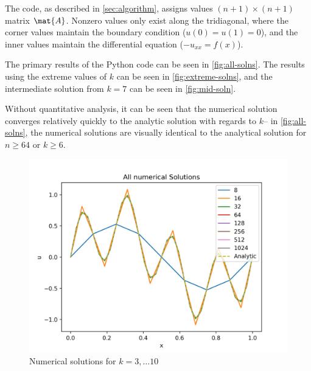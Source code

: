 \documentclass{template}
\begin{document}
The code, as described in \autoref{sec:algorithm}, assigns values $(n+1)\times(n+1)$ matrix $\mat{A}$. Nonzero values only exist along the tridiagonal, where the corner values maintain the boundary condition ($u(0) = u(1) = 0$), and the inner values maintain the differential equation ($-u_{xx} = f(x)$).

The primary results of the Python code can be seen in \autoref{fig:all-solns}. The results using the extreme values of $k$ can be seen in \autoref{fig:extreme-solns}, and the intermediate solution from $k=7$ can be seen in \autoref{fig:mid-soln}.

Without quantitative analysis, it can be seen that the numerical solution converges relatively quickly to the analytic solution with regards to $k$-- in \autoref{fig:all-solns}, the numerical solutions are visually identical to the analytical solution for $n\geq64$ or $k\geq6$. 


\begin{figure}
    \centering
    \includegraphics[width=0.75\linewidth]{all_num_solns.png}
    \caption{Numerical solutions for $k=3,\dots10$}
    \label{fig:all-solns}
\end{figure}
\end{document}
